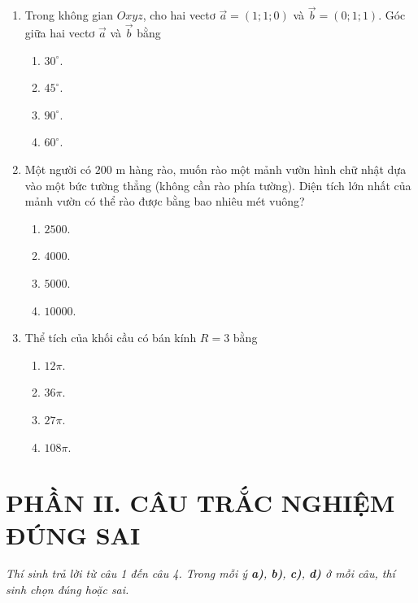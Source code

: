 \documentclass[12pt,a4paper]{article}
\begin{document}
\begin{enumerate}[label=\textbf{Câu \arabic*:}, leftmargin=*]
\item Trong không gian $Oxyz$, cho hai vectơ $\vec{a} = (1; 1; 0)$ và $\vec{b} = (0; 1; 1)$. Góc giữa hai vectơ $\vec{a}$ và $\vec{b}$ bằng
\begin{enumerate}[label=\Alph*.]
    \item $30^\circ$.
    \item $45^\circ$.
    \item $90^\circ$.
    \item $60^\circ$.
\end{enumerate}

\item Một người có $200\text{ m}$ hàng rào, muốn rào một mảnh vườn hình chữ nhật dựa vào một bức tường thẳng (không cần rào phía tường). Diện tích lớn nhất của mảnh vườn có thể rào được bằng bao nhiêu mét vuông?
\begin{enumerate}[label=\Alph*.]
    \item $2500$.
    \item $4000$.
    \item $5000$.
    \item $10000$.
\end{enumerate}

\item Thể tích của khối cầu có bán kính $R = 3$ bằng
\begin{enumerate}[label=\Alph*.]
    \item $12\pi$.
    \item $36\pi$.
    \item $27\pi$.
    \item $108\pi$.
\end{enumerate}

\end{enumerate}

\vspace{0.4cm}
\section*{\large PHẦN II. CÂU TRẮC NGHIỆM ĐÚNG SAI}
\textit{Thí sinh trả lời từ câu 1 đến câu 4. Trong mỗi ý \textbf{a)}, \textbf{b)}, \textbf{c)}, \textbf{d)} ở mỗi câu, thí sinh chọn đúng hoặc sai.}
\end{document}
